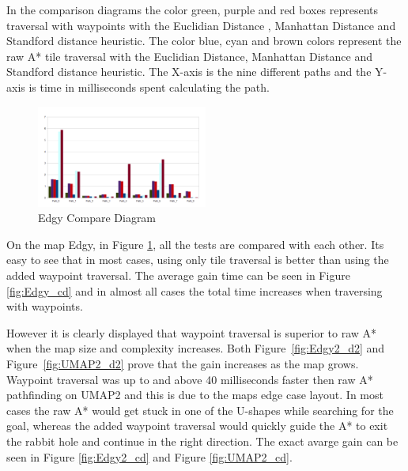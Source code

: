 \documentclass[sigconf]{acmart}
\begin{document}
In the comparison diagrams the color green, purple and red boxes represents traversal with waypoints with the Euclidian Distance , Manhattan Distance and Standford distance heuristic.
The color blue, cyan and brown colors represent the raw A* tile traversal with the Euclidian Distance, Manhattan Distance and Standford distance heuristic.
The  X-axis is the nine different paths and the Y-axis is time in milliseconds spent calculating the path.
\begin{figure}[h!]
\centering
\includegraphics[width=0.5\textwidth,height=\textheight,keepaspectratio]{ChartsAndFigures/Edgy_d2.png}
\caption{Edgy Compare Diagram}
\label{fig:Edgy_d2}
\end{figure}	
On the map Edgy, in Figure \ref{fig:Edgy_d2}, all the tests are compared with each other. Its easy to see that in most cases, using only tile traversal is better than using the added waypoint traversal.
The average gain time can be seen in Figure \ref{fig:Edgy_cd} and in almost all cases the total time increases when traversing with waypoints.
	
However it is clearly displayed that waypoint traversal is superior to raw A* when the map size and complexity increases. Both Figure~\ref{fig:Edgy2_d2} and Figure~\ref{fig:UMAP2_d2} prove that the gain increases as the map grows.
Waypoint traversal was up to and above 40 milliseconds faster then raw A* pathfinding on UMAP2 and this is due to the maps edge case layout. In most cases the raw A* would get stuck in one of the U-shapes while searching for the goal, whereas the added waypoint traversal would quickly guide the A* to exit the rabbit hole and continue in the right direction. The exact avarge gain can be seen in Figure \ref{fig:Edgy2_cd} and Figure \ref{fig:UMAP2_cd}.
	
\end{document}
